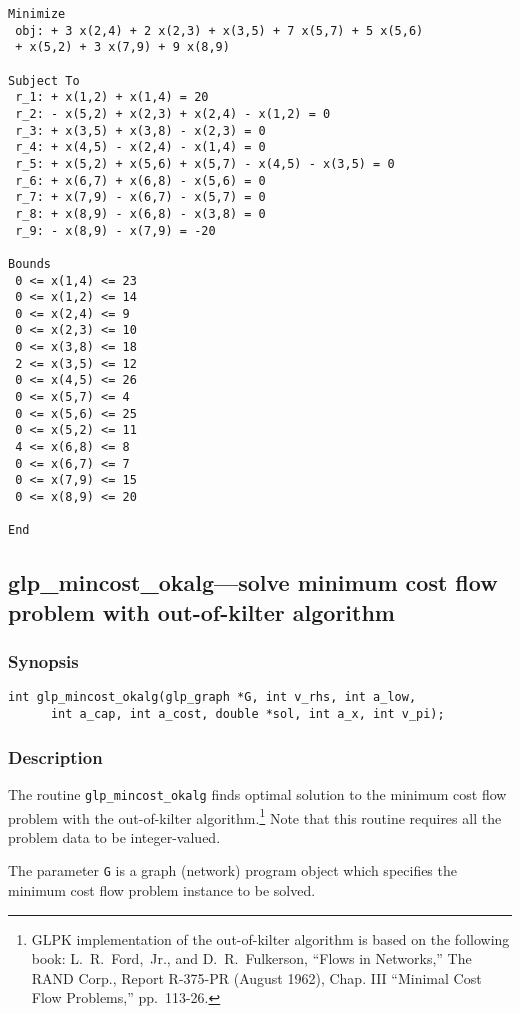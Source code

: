 \begin{verbatim}
Minimize
 obj: + 3 x(2,4) + 2 x(2,3) + x(3,5) + 7 x(5,7) + 5 x(5,6)
 + x(5,2) + 3 x(7,9) + 9 x(8,9)

Subject To
 r_1: + x(1,2) + x(1,4) = 20
 r_2: - x(5,2) + x(2,3) + x(2,4) - x(1,2) = 0
 r_3: + x(3,5) + x(3,8) - x(2,3) = 0
 r_4: + x(4,5) - x(2,4) - x(1,4) = 0
 r_5: + x(5,2) + x(5,6) + x(5,7) - x(4,5) - x(3,5) = 0
 r_6: + x(6,7) + x(6,8) - x(5,6) = 0
 r_7: + x(7,9) - x(6,7) - x(5,7) = 0
 r_8: + x(8,9) - x(6,8) - x(3,8) = 0
 r_9: - x(8,9) - x(7,9) = -20

Bounds
 0 <= x(1,4) <= 23
 0 <= x(1,2) <= 14
 0 <= x(2,4) <= 9
 0 <= x(2,3) <= 10
 0 <= x(3,8) <= 18
 2 <= x(3,5) <= 12
 0 <= x(4,5) <= 26
 0 <= x(5,7) <= 4
 0 <= x(5,6) <= 25
 0 <= x(5,2) <= 11
 4 <= x(6,8) <= 8
 0 <= x(6,7) <= 7
 0 <= x(7,9) <= 15
 0 <= x(8,9) <= 20

End
\end{verbatim}

\subsection{glp\_mincost\_okalg---solve minimum cost flow problem with
out-of-kilter algorithm}

\subsubsection*{Synopsis}

\begin{verbatim}
int glp_mincost_okalg(glp_graph *G, int v_rhs, int a_low,
      int a_cap, int a_cost, double *sol, int a_x, int v_pi);
\end{verbatim}

\subsubsection*{Description}

The routine \verb|glp_mincost_okalg| finds optimal solution to the
minimum cost flow problem with the out-of-kilter
algorithm.\footnote{GLPK implementation of the out-of-kilter algorithm
is based on the following book: L.~R.~Ford,~Jr., and D.~R.~Fulkerson,
``Flows in Networks,'' The RAND Corp., Report R-375-PR (August 1962),
Chap. III ``Minimal Cost Flow Problems,'' pp.~113-26.} Note that this
routine requires all the problem data to be integer-valued.

The parameter \verb|G| is a graph (network) program object which
specifies the minimum cost flow problem instance to be solved.

